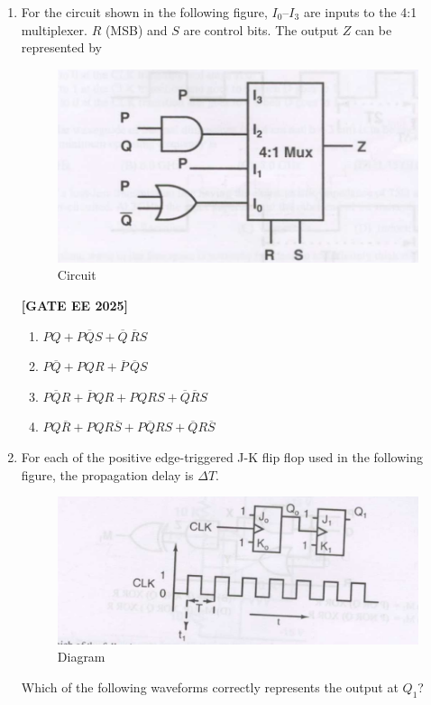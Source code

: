 \documentclass[12pt]{article}
\begin{document}
\begin{enumerate}[leftmargin=*, label=\textbf{Q.\arabic*:}]
\item For the circuit shown in the following figure, $I_0$–$I_3$ are inputs to the 4:1 multiplexer. $R$ (MSB) and $S$ are control bits. The output $Z$ can be represented by
\begin{figure}[H]\centering
\includegraphics[width=0.6\columnwidth]{figs/q58.png}
\caption{Circuit}
\label{fig:q58}
\end{figure}
 
\noindent \textbf{[GATE EE 2025]}
\begin{enumerate}
  \item $PQ + P\overline{Q}S + \overline{Q}\, \overline{R}S$
  \item $P\overline{Q} + PQR + \overline{P}\, \overline{Q}S$
  \item $P\overline{Q}R + \overline{P}QR + P Q R S + \overline{Q}\overline{R}S$
  \item $P Q \overline{R} + P Q R \overline{S} + P\overline{Q}RS + \overline{Q}R\overline{S}$
\end{enumerate}

\item For each of the positive edge-triggered J-K flip flop used in the following figure, the propagation delay is $\Delta T$.

\begin{figure}[H]\centering
\includegraphics[width=0.6\columnwidth]{figs/q59a.png}
\caption{Diagram}
\label{fig:q59a}
\end{figure}

Which of the following waveforms correctly represents the output at $Q_1$?
 

\end{enumerate}
\end{document}
